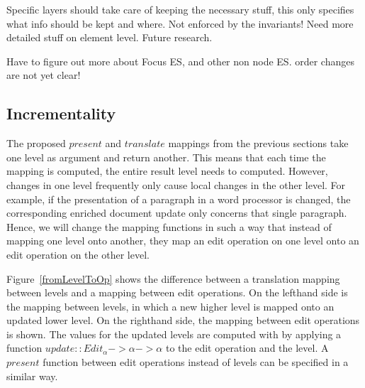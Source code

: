 Specific layers should take care of keeping the necessary stuff, this only specifies what info should be kept and where.
Not enforced by the invariants! Need more detailed stuff on element level. Future research.


Have to figure out more about Focus ES, and other non node ES.
order changes are not yet clear!


%										
%										
%										
\subsection{Incrementality}

The proposed $present$ and $translate$ mappings from the previous sections take one level as argument and return another. This means that each time the mapping is computed, the entire result level needs to computed. However, changes in one level frequently only cause local changes in the other level. For example, if the presentation of a paragraph in a word processor is changed, the corresponding enriched document update only concerns that single paragraph. Hence, we will change the mapping functions in such a way that instead of mapping one level onto another, they map an edit operation on one level onto an edit operation on the other level. 

Figure~\ref{fromLevelToOp} shows the difference between a translation mapping between levels and a mapping between edit operations. On the lefthand side is the mapping between levels, in which a new higher level is mapped onto an updated lower level. On the righthand side, the mapping between edit operations is shown. The values for the updated levels are computed with by applying a function
 $update :: Edit_\alpha -> \alpha -> \alpha$ to the edit operation and the level. A $present$ function between edit operations instead of levels can be specified in a similar way.

